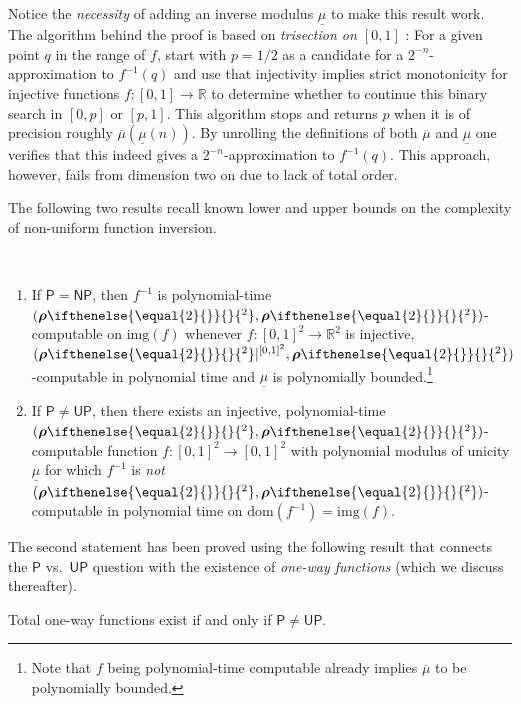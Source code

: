 \documentclass{CSML}
\newcommand{\IR}{\mathbb{R}}
\newcommand{\dom}{\mathrm{dom}} %
\newcommand{\img}{\mathrm{img}} %
\newcommand{\range}{\img}
\newcommand{\PTime}{\mathsf{P}}
\newcommand{\UPTime}{\mathsf{UP}}
\newcommand{\NPTime}{\mathsf{NP}}
\newcommand{\modcont}{\overline{\mu}}
\newcommand{\modsu}{\underline{\mu}}
\newcommand{\realrep}[1][\empty]{ \bm{\rho}\ifnotempty{#1}{^{#1}} }
\newcommand{\ifnotempty}[2]{ \ifthenelse{ \equal{#1}{\empty} }{}{#2} }
\begin{document}
Notice the \emph{necessity} of adding an inverse modulus $\modsu$ to make this
result work.
The algorithm behind the proof is based on \emph{trisection on $[0,1]$}
\cite[Ex.~6.3.6]{Weih00}:
For a given point $q$ in the range of $f$, start with $p = 1/2$ as a candidate
for a $2^{-n}$-approximation to $f^{-1}(q)$ and use that injectivity implies
strict monotonicity for injective functions $f \colon [0,1] \to \IR$ to
determine whether to continue this binary search in $[0,p]$ or $[p,1]$.
This algorithm stops and returns $p$ when it is of precision roughly
$\modcont(\modsu(n))$. By unrolling the definitions of both $\modcont$ and
$\modsu$ one verifies that this indeed gives a $2^{-n}$-approximation to
$f^{-1}(q)$.
This approach, however, fails from dimension two on due to lack of total order.

The following two results recall known lower and upper bounds on the
complexity of non-uniform function inversion.\newpage

\begin{fact} \ %
	\label{s:ko-inv}
	\begin{enumerate}
		\item If $\PTime = \NPTime$, then $f^{-1}$ is polynomial-time
			$(\realrep[2],\realrep[2])$-computable on $\range(f)$
			whenever $f \colon [0,1]^2 \to \IR^2$ is injective,
			$(\realrep[2]|^{[0,1]^2},\realrep[2])$-computable in polynomial time
			and $\modsu$ is polynomially bounded.\footnote{Note that $f$ being
				polynomial-time computable already implies $\modcont$ to be
				polynomially bounded.}
		\item If $\PTime \neq \UPTime$, then there exists an injective, polynomial-time
			$(\realrep[2],\realrep[2])$-computable function $f \colon [0,1]^2 \to [0,1]^2$
			with polynomial modulus of unicity $\modsu$ for which $f^{-1}$ is
			\emph{not} $(\realrep[2],\realrep[2])$-computable in polynomial time on
			$\dom(f^{-1}) = \range(f)$.
	\end{enumerate}
\end{fact}

The second statement has been proved using the following result that connects
the $\PTime$ vs.~$\UPTime$ question with the existence of
\emph{one-way functions}
(which we discuss thereafter).

\begin{fact}[\cite{Ko85,GS88}]
	Total one-way functions exist if and only if
	$\PTime \neq \UPTime$.
\end{fact}
\end{document}
